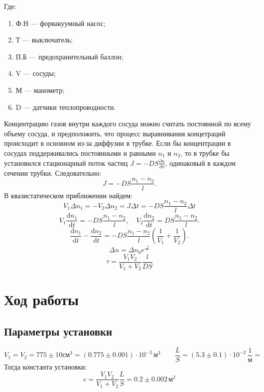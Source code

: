 \documentclass[a4paper,12pt]{article}
\newcommand{\dif}{\mathrm{d}}
\def\dd#1#2{\frac{\partial#1}{\partial#2}}
\begin{document}
		Где:\begin{enumerate}
				\item Ф.Н --- форвакуумный насос;
				\item Т --- выключатель;
				\item П.Б --- предохранительный баллон;
				\item V --- сосуды;
				\item М --- манометр;
				\item D --- датчики теплопроводности.
			\end{enumerate}
		Концентрацию газов внутри каждого сосуда можно считать постоянной по всему объему сосуда, и предположить, что процесс выравнивания концетраций происходит в основном из-за диффузии в трубке.
		Если бы концентрации в сосудах поддерживались постоянными и равными $n_1$ и $n_2$, то в трубке бы установился стационарный поток частиц $J = -DS\dd{n}{x}$, одинаковый в каждом сечении трубки. Следовательно:
		\begin{equation}
			J = -DS\frac{n_1-n_2}{l}.
		\end{equation}
		В квазистатическом приближении найдем:
		\begin{equation}
			V_1\Delta n_1 = -V_2\Delta n_2 = J\Delta t = -DS\frac{n_1-n_2}{l}\Delta t
		\end{equation}
		\begin{equation}
			V_1\frac{\dif n_1}{\dif t} = -DS\frac{n_1-n_2}{l}, \quad V_2\frac{\dif n_2}{\dif t} = DS\frac{n_1-n_2}{l}.
		\end{equation}
		\begin{equation}
			\frac{\dif n_1}{\dif t}-\frac{\dif n_2}{\dif t} = -DS\frac{n_1-n_2}{l}\left(\frac{1}{V_1}+\frac{1}{V_2}\right).
		\end{equation}
		\begin{equation}
			\Delta n = \Delta n_0 e^{\frac{-t}{\tau}}
		\end{equation}
		\begin{equation}
			\tau = \frac{V_1V_2}{V_1+V_2}\frac{l}{DS}
		\end{equation}
	\section{Ход работы}
		\subsection{Параметры установки}
		\[ 
		V_1 = V_2 = 775 \pm 10\text{см}^3=\left(0.775\pm 0.001 \right)\cdot10^{-3}\,\text{м}^3 \qquad \frac{L}{S} = \left(5.3\pm 0.1\right)\cdot 10^{-2}\,\frac{1}{\text{м}} = 
		\]
		Тогда константа установки:
		\[
		c = \frac{V_1V_2}{V_1+V_2}\frac{L}{S} = 0.2 \pm 0.002 \,\text{м}^2
		\]
\end{document}
